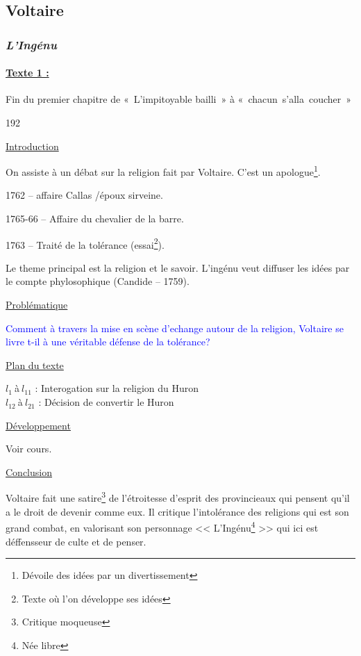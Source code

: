 \documentclass[12pt,a4paper]{article}
\begin{document}
			\subsection{Voltaire}
				\subsubsection[L'ing\'enu]{\textit{L'Ing\'enu}}
					\paragraph[Texte 1 (5)]{\textbf{\underline{Texte 1 :}}}
		Fin du premier chapitre de «~L'impitoyable bailli~» \`a «~chacun~s'alla~coucher~»

		\begin{dingautolist}{192}

		\item \underline{Introduction} \par
			On assiste à un débat sur la religion fait par Voltaire. C'est un apologue\footnote{Dévoile des idées par un divertissement}.\par
		1762 -- affaire Callas /époux sirveine.\par
		1765-66 -- Affaire du chevalier de la barre.\par
		1763 -- Traité de la tolérance (essai\footnote{Texte où l'on développe ses idées}).\par
		Le theme principal est la religion et le savoir. L'ingénu veut diffuser les idées par le compte phylosophique (Candide -- 1759).

		\item \underline{Probl\'ematique }\par
			\textcolor{blue}{Comment à travers la mise en scène d'echange autour de la religion, Voltaire se livre t-il à une véritable défense de la tolérance? }

		\item \underline{Plan du texte} \par
			$l_{1}~$\`a$~l_{11}$ : Interogation sur la religion du Huron\\ 
			$l_{12}~$\`a$~l_{21}$ : Décision de convertir le Huron
		\item \underline{D\'eveloppement} \par
				Voir cours.

		\item \underline{Conclusion} \par
			Voltaire fait une satire\footnote{Critique moqueuse} de l'étroitesse d'esprit des provincieaux qui pensent qu'il a le droit de devenir comme eux. Il critique l'intolérance des religions qui est son grand combat, en valorisant son personnage << L'Ingénu\footnote{Née libre} >> qui ici est déffensseur de culte et de penser. 




		\end{dingautolist}
		 \newpage
\end{document}

